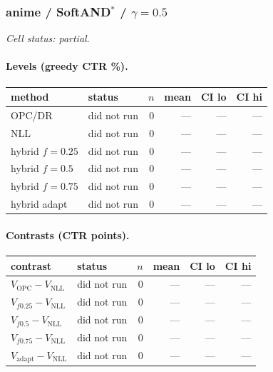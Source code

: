 \documentclass[10pt,a4paper]{article}
\begin{document}
\subsubsection{anime / SoftAND$^*$ / $\gamma=0.5$}
\emph{Cell status: partial}.
\paragraph{Levels (greedy CTR \%).}
{\centering\small\begin{tabular}{llrrrr}
\toprule method & status & $n$ & mean & CI lo & CI hi \\
\midrule
OPC/DR & did not run & 0 & --- & --- & --- \\
NLL & did not run & 0 & --- & --- & --- \\
hybrid $f{=}0.25$ & did not run & 0 & --- & --- & --- \\
hybrid $f{=}0.5$ & did not run & 0 & --- & --- & --- \\
hybrid $f{=}0.75$ & did not run & 0 & --- & --- & --- \\
hybrid adapt & did not run & 0 & --- & --- & --- \\
\bottomrule\end{tabular}\par}
\paragraph{Contrasts (CTR points).}
{\centering\small\begin{tabular}{llrrrr}
\toprule contrast & status & $n$ & mean & CI lo & CI hi \\
\midrule
$V_{\mathrm{OPC}}-V_{\mathrm{NLL}}$ & did not run & 0 & --- & --- & --- \\
$V_{f0.25}-V_{\mathrm{NLL}}$ & did not run & 0 & --- & --- & --- \\
$V_{f0.5}-V_{\mathrm{NLL}}$ & did not run & 0 & --- & --- & --- \\
$V_{f0.75}-V_{\mathrm{NLL}}$ & did not run & 0 & --- & --- & --- \\
$V_{\mathrm{adapt}}-V_{\mathrm{NLL}}$ & did not run & 0 & --- & --- & --- \\
\bottomrule\end{tabular}\par}
\end{document}

